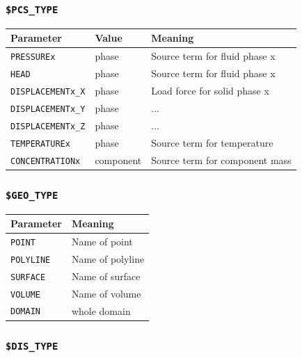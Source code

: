 \subsubsection{\texttt{\$PCS\_TYPE}}

\begin{tabular*}{12.773cm}{|p{}|p{1.5cm}|p{7cm}|} \hline
Parameter          & Value & Meaning \\ \hline \hline
%
\texttt{PRESSUREx}        & phase & Source term for fluid phase x \\
\texttt{HEAD}             & phase & Source term for fluid phase x \\
\texttt{DISPLACEMENTx\_X} & phase & Load force for solid phase x \\
\texttt{DISPLACEMENTx\_Y} & phase & ... \\
\texttt{DISPLACEMENTx\_Z} & phase & ... \\
\texttt{TEMPERATUREx}     & phase & Source term for temperature \\
\texttt{CONCENTRATIONx}   & component & Source term for component mass \\
\hline
\end{tabular*}

\subsubsection{\texttt{\$GEO\_TYPE}}

\begin{tabular*}{12.773cm}{|p{}|p{8.9cm}|} \hline
Parameter          & Meaning \\ \hline \hline
%
\texttt{POINT}     & Name of point \\
\texttt{POLYLINE}  & Name of polyline \\
\texttt{SURFACE}   & Name of surface \\
\texttt{VOLUME }   & Name of volume \\
\texttt{DOMAIN }   & whole domain \\
\hline
\end{tabular*}

\subsubsection{\texttt{\$DIS\_TYPE}}

